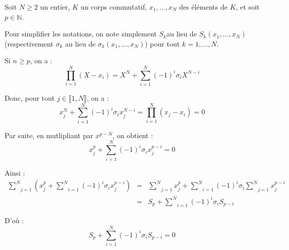
Soit $N \geqslant 2$ un entier, $K$ un corps commutatif, $x_1, \ldots, x_N$
des {\'e}l{\'e}ments de $K$, et soit $p \in \mathbb{N}$.

Pour simplifier les notations, on note simplement $S_k $au lieu de $S_k (x_1,
\ldots, x_N)$ (respectivement $\sigma_k$ au lieu de $\sigma_k (x_1, \ldots,
x_N)$) pour tout $k = 1, \ldots, N$.

Si $n \geqslant p$, on a :
\[ \underset{i = 1}{\overset{N}{\prod}} (X - x_i) = X^N + \underset{i =
   1}{\overset{N}{\sum}} (- 1)^i \sigma_i X^{N - i} \]


Donc, pour tout $j \in \llbracket 1, N \rrbracket$, on a :
\[ x_j^N + \underset{i = 1}{\overset{N}{\sum}} (- 1)^i \sigma_i x_j^{N - i} =
   \underset{i = 1}{\overset{N}{\prod}} (x_j - x_i) = 0 \]


Par suite, en mutlipliant par $x^{p - N}$, on obtient :
\[ x_j^p + \underset{i = 1}{\overset{N}{\sum}} (- 1)^i \sigma_i x_j^{p - i} =
   0 \]


Ainsi :
\begin{eqnarray*}
  \underset{j = 1}{\overset{N}{\sum}} \left( x_j^p + \underset{i =
  1}{\overset{N}{\sum}} (- 1)^i \sigma_i x_j^{p - i} \right) & = & \underset{j
  = 1}{\overset{N}{\sum}} x_j^p + \underset{i = 1}{\overset{N}{\sum}} (- 1)^i
  \sigma_i \underset{j = 1}{\overset{N}{\sum}} x_j^{p - i}\\
  & = & S_p + \underset{i = 1}{\overset{N}{\sum}} (- 1)^i \sigma_i S_{p - i}
\end{eqnarray*}


D'o{\`u} :
\[ S_p + \underset{i = 1}{\overset{N}{\sum}} (- 1)^i \sigma_i S_{p - i} = 0 \]


